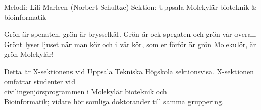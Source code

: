 \begin{song}

\begin{songmeta}
Melodi: Lili Marleen (Norbert Schultze)
Sektion: Uppsala Molekylär bioteknik \& bioinformatik
\end{songmeta}

\begin{songtext}
Grön är spenaten, grön är brysselkål.
Grön är ock spegaten och grön vår overall.
Grönt lyser ljuset när man kör
och i vår kör, som er förför
är grön Molekulör,
är grön Molekylär!
\end{songtext}

\begin{songnotes}
Detta är X-sektionens vid Uppsala Tekniska Högskola sektionsvisa. X-sektionen
omfattar studenter vid \\
civilingenjörsprogrammen i Molekylär bioteknik och \\
Bioinformatik; vidare hör somliga doktorander till samma gruppering.
\end{songnotes}

\end{song}
